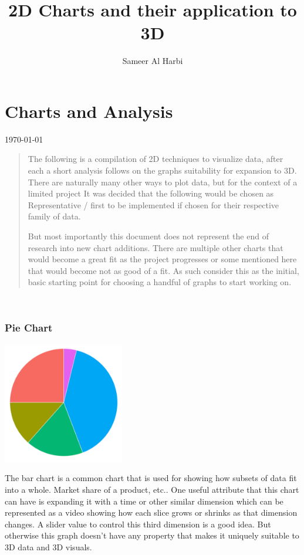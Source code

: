 \documentclass{report}
\title{2D Charts and their application to 3D}
\author{Sameer Al Harbi}
\begin{document}
\maketitle
\part{Charts and Analysis}
\today
\\
\begin{quote}
    The following is a compilation of 2D techniques to visualize data, after each a short analysis follows on the graphs suitability for expansion to 3D. There are naturally many other ways to plot data, but for the context of a limited project It was decided that the following would be chosen as Representative / first to be implemented if chosen for their respective family of data.
    
    But most importantly this document does not represent the end of research into new chart additions. There are multiple other charts that would become a great fit as the project progresses or some mentioned here that would become not as good of a fit. As such consider this as the initial, basic starting point for choosing a handful of graphs to start working on. 
\end{quote}
\\
\section{Pie Chart}
\begin{center}
    \includegraphics[width=150pt]{piechart-ggplot22.png}
\end{center}

The bar chart is a common chart that is used for showing how subsets of data fit into a whole. Market share of a product, etc.. One useful attribute that this chart can have is expanding it with a time or other similar dimension which can be represented as a video showing how each slice grows or shrinks as that dimension changes. A slider value to control this third dimension is a good idea. But otherwise this graph doesn't have any property that makes it uniquely suitable to 3D data and 3D visuals.
\end{document}
